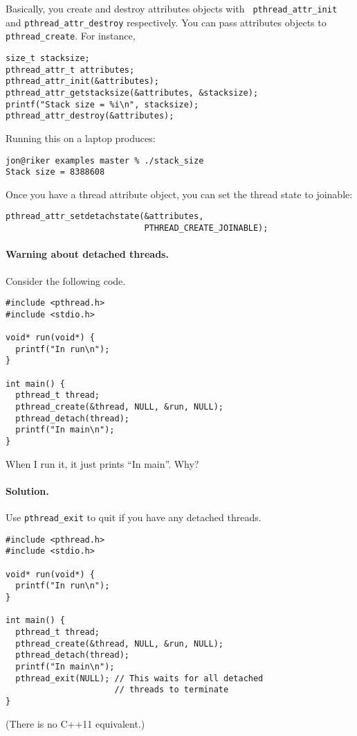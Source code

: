 \documentclass[11pt]{article}
\begin{document}
Basically, you create and destroy attributes objects with {\tt
  pthread\_attr\_init} and {\tt pthread\_attr\_destroy}
respectively. You can pass attributes objects to {\tt
  pthread\_create}. For instance,

  \begin{lstlisting}
size_t stacksize;
pthread_attr_t attributes;
pthread_attr_init(&attributes);
pthread_attr_getstacksize(&attributes, &stacksize);
printf("Stack size = %i\n", stacksize);
pthread_attr_destroy(&attributes);
  \end{lstlisting}

Running this on a laptop produces:

  \begin{lstlisting}
jon@riker examples master % ./stack_size 
Stack size = 8388608
  \end{lstlisting}

Once you have a thread attribute object, you can set the thread state to joinable:
  \begin{lstlisting}
pthread_attr_setdetachstate(&attributes,
                            PTHREAD_CREATE_JOINABLE);
  \end{lstlisting}

\paragraph{Warning about detached threads.} Consider the following code.

\begin{lstlisting}
#include <pthread.h>
#include <stdio.h>

void* run(void*) {
  printf("In run\n");
}

int main() {
  pthread_t thread;
  pthread_create(&thread, NULL, &run, NULL);
  pthread_detach(thread);
  printf("In main\n");
}
\end{lstlisting}

  When I run it, it just prints ``In main''. Why?

\paragraph{Solution.} Use {\tt pthread\_exit} to quit if you have any detached threads.
  \begin{lstlisting}
#include <pthread.h>
#include <stdio.h>

void* run(void*) {
  printf("In run\n");
}

int main() {
  pthread_t thread;
  pthread_create(&thread, NULL, &run, NULL);
  pthread_detach(thread);
  printf("In main\n");
  pthread_exit(NULL); // This waits for all detached
                      // threads to terminate
}
  \end{lstlisting}
(There is no C++11 equivalent.)
\end{document}
